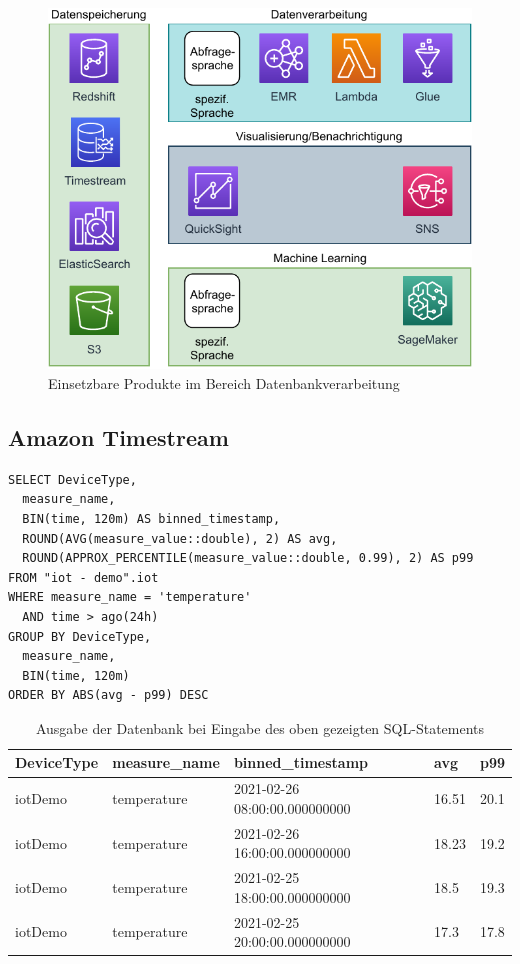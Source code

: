 \begin{figure}[H]
\centering
\includegraphics[width=\textwidth]{graphics/Overview-DB.pdf}
\caption{Einsetzbare Produkte im Bereich Datenbankverarbeitung}
\label{abb:ProdukteDB}
\end{figure}

\subsection{Amazon Timestream}
\lstset{language=SQL} 
\begin{lstlisting}
SELECT DeviceType,
  measure_name,
  BIN(time, 120m) AS binned_timestamp,
  ROUND(AVG(measure_value::double), 2) AS avg,
  ROUND(APPROX_PERCENTILE(measure_value::double, 0.99), 2) AS p99 
FROM "iot - demo".iot 
WHERE measure_name = 'temperature' 
  AND time > ago(24h) 
GROUP BY DeviceType,
  measure_name,
  BIN(time, 120m) 
ORDER BY ABS(avg - p99) DESC
\end{lstlisting}

\begin{table}[H]
\centering
\begin{tabular}{|l|l|l|l|l|}
\hline
DeviceType & measure\_name & binned\_timestamp & avg & p99 \\ \hline
iotDemo & temperature & 2021-02-26 08:00:00.000000000 & 16.51 & 20.1 \\ \hline
iotDemo & temperature & 2021-02-26 16:00:00.000000000 & 18.23 & 19.2 \\ \hline
iotDemo & temperature & 2021-02-25 18:00:00.000000000 & 18.5 & 19.3 \\ \hline
iotDemo & temperature & 2021-02-25 20:00:00.000000000 & 17.3 & 17.8 \\ \hline
\end{tabular}
\caption{Ausgabe der Datenbank bei Eingabe des oben gezeigten SQL-Statements}
\label{tab:AusgabeSQL}
\end{table}

